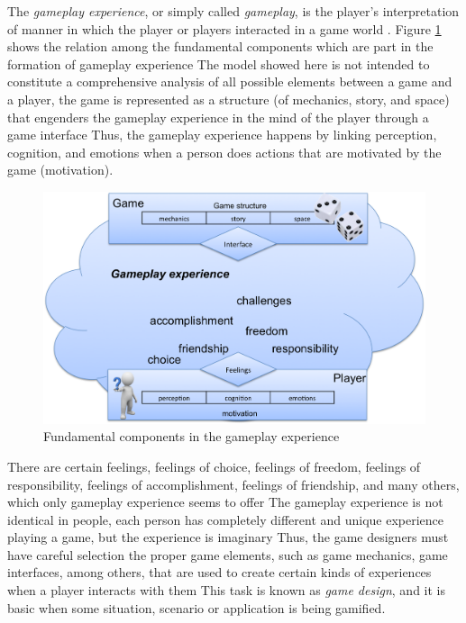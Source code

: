 The \emph{gameplay experience}, or simply called \emph{gameplay}, is the player's interpretation of manner in which the player or players interacted in a game world \cite{SalenZimmerman2004, Lindley2004, MayraErmi2005}.
Figure \ref{fig:gameplay-experience} shows the relation among the fundamental components which are part in the formation of gameplay experience
The model showed here is not intended to constitute a comprehensive analysis of all possible elements between a game and a player, the game is represented as a structure (of mechanics, story, and space) that engenders the gameplay experience in the mind of the player through a game interface
Thus, the gameplay experience happens by linking perception, cognition, and emotions when a person does actions that are motivated by the game (motivation).

\begin{figure}[htb]
 \caption{Fundamental components in the gameplay experience}
 \label{fig:gameplay-experience}
 \centering
 \includegraphics[width=1\textwidth]{images/chap-general-background/gameplay-experience.png}
\end{figure}

There are certain feelings, feelings of choice, feelings of freedom, feelings of responsibility, feelings of accomplishment, feelings of friendship, and many others, which only gameplay experience seems to offer \cite{Schell2008}
The gameplay experience is not identical in people, each person has completely different and unique experience playing a game, but the experience is imaginary
Thus, the game designers must have careful selection the proper game elements, such as game mechanics, game interfaces, among others, that are used to create certain kinds of experiences when a player interacts with them
This task is known as \emph{game design}, and it is basic when some situation, scenario or application is being gamified.




